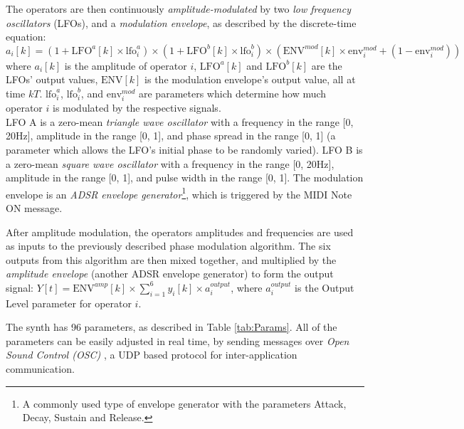 \documentclass[11pt, oneside]{report}   	%
\begin{document}
The operators are then continuously \emph{amplitude-modulated} by two \emph{low frequency oscillators} (LFOs), and a \emph{modulation envelope}, as described by the discrete-time equation:
 \begin{equation}
a_i[k] = (1 + \mathrm{LFO}^a[k]\times\mathrm{lfo}^{a}_i)\times(1 + \mathrm{LFO}^b[k]\times\mathrm{lfo}^{b}_i)\times(\mathrm{ENV}^{mod}[k]\times\mathrm{env}^{mod}_i + (1-\mathrm{env}^{mod}_i))
\end{equation}
where  $a_i[k]$ is the amplitude of operator $i$, $\mathrm{LFO}^a[k]$ and $\mathrm{LFO}^b[k]$ are the LFOs' output values, $\mathrm{ENV}[k]$ is the modulation envelope's output value, all at time $kT$. $\mathrm{lfo}^{a}_i$, $\mathrm{lfo}^{b}_i$, and $\mathrm{env}^{mod}_{i}$ are parameters which determine how much operator $i$ is modulated by the respective signals. \\
LFO A is a zero-mean \emph{triangle wave oscillator} with a frequency in the range [0, 20\si{\hertz}], amplitude in the range [0, 1], and phase spread in the range [0, 1] (a parameter which allows the LFO's initial phase to be randomly varied). LFO B is a zero-mean \emph{square wave oscillator} with a frequency in the range [0, 20\si{\hertz}], amplitude in the range [0, 1], and pulse width in the range [0, 1]. The modulation envelope is an \emph{ADSR  envelope generator}\footnote{A commonly used type of envelope generator with the parameters Attack, Decay, Sustain and Release.}, which is triggered by the MIDI Note ON message.


After amplitude modulation, the operators amplitudes and frequencies are used as inputs to the previously described phase modulation algorithm. The six outputs from this algorithm are then mixed together, and multiplied by the \emph{amplitude envelope} (another ADSR envelope generator) to form the output signal: $Y[t] = \mathrm{ENV}^{amp}[k]\times\sum_{i=1}^{6}y_i[k]\times a_i^{output}$, where $a_i^{output}$ is the Output Level parameter for operator $i$.

The synth has 96 parameters, as described in Table \ref{tab:Params}. All of the parameters can be easily adjusted in real time, by sending messages over \emph{Open Sound Control (OSC)} \cite{OSC}, a UDP based protocol for inter-application communication.
\end{document}
